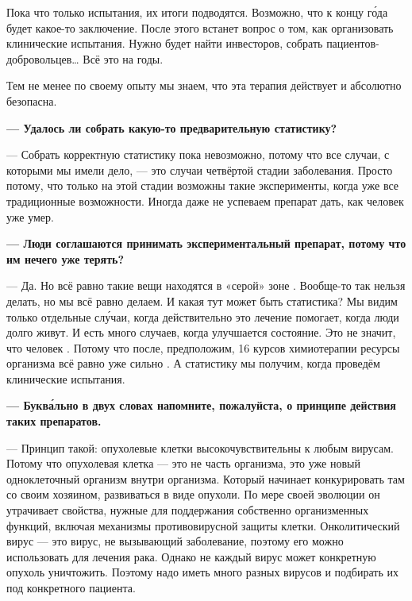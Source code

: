 Пока что  только  испытания, их итоги подводятся. Возможно, что к концу г\'{о}да будет какое-то заключение. После этого встанет вопрос о том, как организовать клинические испытания. Нужно будет найти инвесторов, собрать пациентов-добровольцев\dots{} Всё это  на годы.

Тем не менее по своему опыту мы знаем, что эта терапия действует и абсолютно безопасна.

{\bf --- Удалось ли собрать какую-то предварительную статистику?}

--- Собрать корректную статистику пока невозможно, потому что все случаи, с которыми мы имели дело, --- это случаи четвёртой стадии заболевания. Просто потому, что только на этой стадии возможны такие эксперименты, когда уже  все традиционные возможности. Иногда даже не успеваем препарат дать, как человек уже умер.

{\bf --- Люди соглашаются принимать экспериментальный препарат, потому что им нечего уже терять?}

--- Да. Но всё равно такие вещи находятся в «серой» зоне . Вообще-то так нельзя делать, но мы всё равно делаем. И какая тут может быть статистика? Мы видим только отдельные сл\'{у}чаи, когда действительно это лечение помогает, когда люди долго живут. И есть много случаев, когда улучшается состояние. Это не значит, что человек . Потому что после, предположим, 16 курсов химиотерапии ресурсы организма всё равно уже сильно . А статистику мы получим, когда проведём клинические испытания.

{\bf --- Букв\'{а}льно в двух словах напомните, пожалуйста, о принципе действия таких препаратов.}

--- Принцип такой: опухолевые клетки высокочувствительны к любым вирусам. Потому что опухолевая клетка --- это не часть организма, это уже новый одноклеточный организм внутри организма. Который начинает конкурировать там со своим хозяином, развиваться в виде опухоли. По мере своей эволюции он утрачивает свойства, нужные для поддержания собственно организменных функций, включая механизмы противовирусной защиты клетки. Онколитический вирус --- это вирус, не вызывающий заболевание, поэтому его можно использовать для лечения рака. Однако не каждый вирус может конкретную опухоль уничтожить. Поэтому надо иметь много разных вирусов и подбирать их под конкретного пациента.

